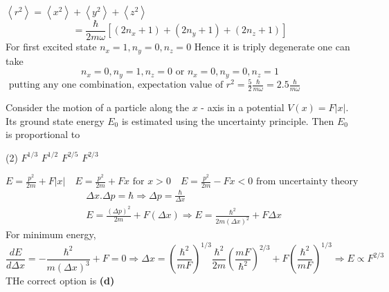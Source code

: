 \begin{enumerate}
\begin{minipage}{\textwidth}
	\end{minipage}
	\begin{answer}
		$\left\langle r^{2}\right\rangle=\left\langle x^{2}\right\rangle+\left\langle y^{2}\right\rangle+\left\langle z^{2}\right\rangle$\\
		$$
		=\frac{\hbar}{2 m \omega}\left[\left(2 n_{x}+1\right)+\left(2 n_{y}+1\right)+\left(2 n_{z}+1\right)\right]
		$$
		For first excited state $n_{x}=1, n_{y}=0, n_{z}=0$
		Hence it is triply degenerate one can take
		$$
		n_{x}=0, n_{y}=1, n_{z}=0 \text { or } n_{x}=0, n_{y}=0, n_{z}=1
		$$
		$\text { putting any one combination, expectation value of } r^{2}=\frac{5}{2} \frac{\hbar}{m \omega}=2.5 \frac{\hbar}{m \omega}$
	\end{answer}
	\begin{minipage}{\textwidth}
		\item Consider the motion of a particle along the $x$ - axis in a potential $V(x)=F|x|$. Its ground state energy $E_{0}$ is estimated using the uncertainty principle. Then $E_{0}$ is proportional to
	\end{minipage}
	\begin{tasks}(2)
		\task[\textbf{A.}] $F^{1 / 3}$
		\task[\textbf{B.}] $F^{1 / 2}$
		\task[\textbf{C.}]$F^{2 / 5}$
		\task[\textbf{D.}]$F^{2 / 3}$
	\end{tasks}
	\begin{answer}
		$E=\frac{p^{2}}{2 m}+F|x| \quad E=\frac{p^{2}}{2 m}+F x \text { for } x>0 \quad E=\frac{p^{2}}{2 m}-F x<0 \text { from uncertainty theory }$\\
		\begin{align*}
		&\Delta x . \Delta p=\hbar \Rightarrow \Delta p=\frac{\hbar}{\Delta x} \\
		&E=\frac{(\Delta p)^{2}}{2 m}+F(\Delta x) \Rightarrow E=\frac{\hbar^{2}}{2 m(\Delta x)^{2}}+F \Delta x
		\end{align*}
		For minimum energy,
		$$
		\frac{d E}{d \Delta x}=-\frac{\hbar^{2}}{m(\Delta x)^{3}}+F=0 \Rightarrow \Delta x=\left(\frac{\hbar^{2}}{m F}\right)^{1 / 3} \frac{\hbar^{2}}{2 m}\left(\frac{m F}{\hbar^{2}}\right)^{2 / 3}+F\left(\frac{\hbar^{2}}{m F}\right)^{1 / 3} \Rightarrow E \propto F^{2 / 3}
		$$ THe correct option is \textbf{(d)}
	\end{answer}
\end{enumerate}